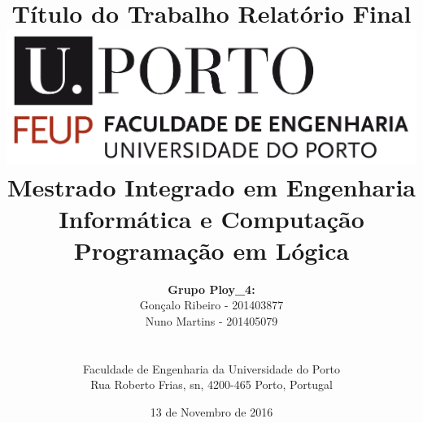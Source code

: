 \documentclass[a4paper]{article}
\begin{document}
\setlength{\textwidth}{16cm}
\setlength{\textheight}{22cm}

\title{\Huge\textbf{Título do Trabalho}\linebreak\linebreak\linebreak
\Large\textbf{Relatório Final}\linebreak\linebreak
\linebreak\linebreak
\includegraphics[scale=0.1]{feup-logo.png}\linebreak\linebreak
\linebreak\linebreak
\Large{Mestrado Integrado em Engenharia Informática e Computação} \linebreak\linebreak
\Large{Programação em Lógica}\linebreak
}

\author{\textbf{Grupo Ploy_4:}\\ Gonçalo Ribeiro - 201403877 \\ Nuno Martins - 201405079 \\\linebreak\linebreak \\
 \\ Faculdade de Engenharia da Universidade do Porto \\ Rua Roberto Frias, s\/n, 4200-465 Porto, Portugal \linebreak\linebreak\linebreak
\linebreak\linebreak\vspace{1cm}}
\date{13 de Novembro de 2016}
\maketitle
\thispagestyle{empty}
\end{document}
